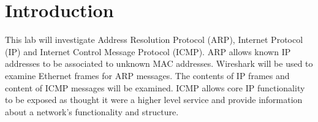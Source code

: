 \section{Introduction}\label{sec:intro}
This lab will investigate Address Resolution Protocol (ARP), Internet Protocol (IP) and Internet Control Message Protocol (ICMP). ARP allows known IP addresses to be associated to unknown MAC addresses. Wireshark will be used to examine Ethernet frames for ARP messages. The contents of IP frames and content of ICMP messages will be examined. ICMP allows core IP functionality to be exposed as thought it were a higher level service and provide information about a network's functionality and structure.
